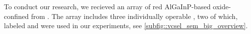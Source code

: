 
	To conduct our research, we recieved an array of red AlGaInP-based oxide-confined \VCSELs from \michler. The array includes three individually operable \VCSELs, two of which, labeled \BmFour and \BmTwo were used in our experiments, see \autoref{subfig::vcsel_sem_big_overview}.

